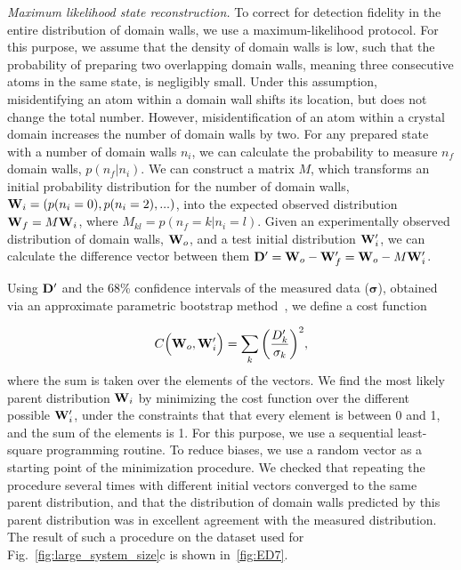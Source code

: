 \documentclass[prl,nobalancelastpage,twocolumn,superscriptaddress,nofootinbib]{revtex4}
\begin{document}
\begin{footnotesize}
\noindent
\emph{Maximum likelihood state reconstruction.}
To correct for detection fidelity in the entire distribution of domain
walls, we use a maximum-likelihood protocol. For this purpose, we assume that
the density of domain walls is low, such that the probability of preparing two
overlapping domain walls, meaning three consecutive atoms in the same state, is
negligibly small. Under this assumption, misidentifying an atom within a domain
wall shifts its location, but does not change the total number. However,
misidentification of an atom within a crystal domain increases the number of
domain walls by two. For any prepared state with a number of domain walls
$n_i$, we can calculate the probability to measure $n_f$ domain walls,
$p(n_f|n_i)$. We can construct a matrix $M$, which transforms an initial
probability distribution for the number of domain walls, ${\bf W}_i = (p(n_i = 0),
p(n_i = 2), ...)$, into the expected observed distribution ${\bf W}_f = M {\bf
W}_i$, where $M_{kl} = p(n_f=k|n_i=l)$.  Given an experimentally observed
distribution of domain walls, ${\bf W}_o$, and a test initial distribution
${\bf W}_i'$, we can calculate the difference vector between them ${\bf D}' =
{\bf W}_o - {\bf W}_f' = {\bf W}_o - M {\bf W}_i'$.

Using ${\bf D}'$ and the 68\% confidence intervals of the measured data
($\boldsymbol{\sigma}$), obtained via an approximate parametric bootstrap
method~\cite{Glaz1999}, we define a cost function

\begin{equation}
    \label{eq:CostFunction}
    C\Big({\bf W}_o, {\bf W}_i'\Big) = \sum_{k} \bigg(\frac{D'_{k}}{\sigma_{k}}\bigg)^{2},
\end{equation}
where the sum is taken over the elements of the vectors. We find the most
likely parent distribution ${\bf W}_i$ by minimizing the cost function over
the different possible ${\bf W}_i'$, under the constraints that that every
element is between 0 and 1, and the sum of the elements is 1. For this purpose,
we use a sequential least-square programming routine. To reduce biases, we use
a random vector as a starting point of the minimization procedure. We checked
that repeating the procedure several times with different initial vectors
converged to the same parent distribution, and that the distribution of domain
walls predicted by this parent distribution was in excellent agreement with the
measured distribution. The result of such a procedure on the dataset used for
Fig.~\ref{fig:large_system_size}c is shown in~\ref{fig:ED7}.


\end{footnotesize}
\end{document}

